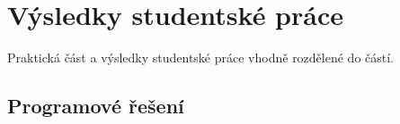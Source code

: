 \chapter{Výsledky studentské práce}

Praktická část a výsledky studentské práce vhodně rozdělené do částí.

\section{Programové řešení}